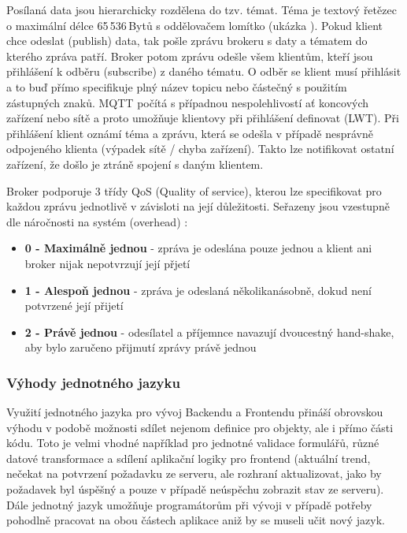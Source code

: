 Posílaná data jsou hierarchicky rozdělena do tzv. témat. Téma je textový řetězec o maximální délce 65\,536\,Bytů s oddělovačem lomítko (ukázka ). Pokud klient chce odeslat (publish) data, tak pošle zprávu brokeru s daty a tématem do kterého zpráva patří. Broker potom zprávu odešle všem klientům, kteří jsou přihlášení k odběru (subscribe) z daného tématu. O odběr se klient musí přihlásit a to buď přímo specifikuje plný název topicu nebo částečný s použitím zástupných znaků. MQTT počítá s případnou nespolehlivostí ať koncových zařízení nebo sítě a proto umožňuje klientovy při přihlášení definovat  (\hypertarget{LWT}{LWT}). Při přihlášení klient oznámí téma a zprávu, která se odešla v případě nesprávně odpojeného klienta (výpadek sítě / chyba zařízení). Takto lze notifikovat ostatní zařízení, že došlo je ztráně spojení s daným klientem. \cite{mqtt}

Broker podporuje 3 třídy QoS (Quality of service), kterou lze specifikovat pro každou zprávu jednotlivě v závisloti na její důležitosti. Seřazeny jsou vzestupně dle náročnosti na systém (overhead) \cite{mqtt}:
\begin{itemize}
    \item \textbf{0 - Maximálně jednou} - zpráva je odeslána pouze jednou a klient ani broker nijak nepotvrzují její přjetí
    \item \textbf{1 - Alespoň jednou} - zpráva je odeslaná několikanásobně, dokud není potvrzené její přijetí
    \item \textbf{2 - Právě jednou} - odesílatel a příjemnce navazují dvoucestný hand-shake, aby bylo zaručeno přijmutí zprávy právě jednou
\end{itemize}


\subsubsection{Výhody jednotného jazyku}
Využití jednotného jazyka pro vývoj Backendu a Frontendu přináší obrovskou výhodu v podobě možnosti sdílet nejenom definice pro objekty, ale i přímo části kódu. Toto je velmi vhodné například pro jednotné validace formulářů, různé datové transformace a sdílení aplikační logiky pro frontend  (aktuální trend, nečekat na potvrzení požadavku ze serveru, ale rozhraní aktualizovat, jako by požadavek byl úspěšný a pouze v případě neúspěchu zobrazit stav ze serveru). Dále jednotný jazyk umožňuje programátorům při vývoji v případě potřeby pohodlně pracovat na obou částech aplikace aniž by se museli učit nový jazyk.


